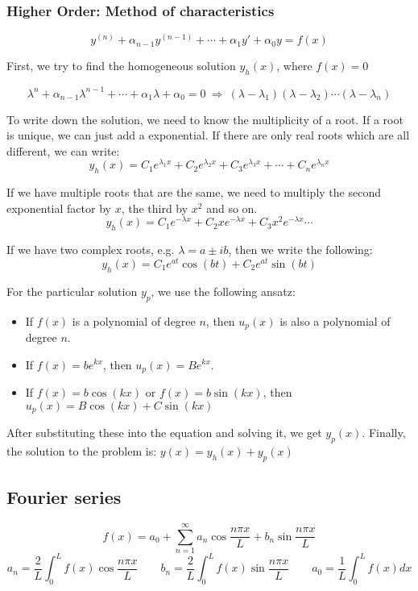\documentclass[a4paper]{article}
\begin{document}
\begin{twocolumn}
\subsubsection{Higher Order: Method of characteristics}

$$y^{(n)} + \alpha_{n-1} y^{(n-1)} + \cdots +  \alpha_1 y' + \alpha_0 y = f(x)$$

First, we try to find the homogeneous solution $y_h(x)$, where $f(x) = 0$

$$\lambda^n + \alpha_{n-1} \lambda^{n-1} + \cdots + \alpha_1 \lambda + \alpha_0 = 0 \ \Rightarrow \ (\lambda - \lambda_1) (\lambda - \lambda_2) \cdots (\lambda - \lambda_n)$$

To write down the solution, we need to know the multiplicity of a root. If a root is unique, we can just add a exponential. If there are only real roots which are all different, we can write:
$$y_h(x) = C_1 e^{\lambda_1 x} + C_2 e^{\lambda_2 x} + C_3 e^{\lambda_3 x} + \cdots + C_n e^{\lambda_n x}$$

If we have multiple roots that are the same, we need to multiply the second exponential factor by $x$, the third by $x^2$ and so on. 
$$y_h(x) = C_1 e^{-\lambda x} + C_2 x e^{-\lambda x} + C_3 x^2 e^{-\lambda x} \cdots$$

If we have two complex roots, e.g. $\lambda = a \pm ib$, then we write the following:
$$y_h(x) = C_1 e^{a t} \cos(bt) + C_2 e^{a t} \sin(bt)$$ 

For the particular solution $y_p$, we use the following ansatz:
\begin{itemize}
	\item If $f(x)$ is a polynomial of degree $n$, then $u_p(x)$ is also a polynomial of degree $n$. 
	\item If $f(x) = b e^{k x}$, then $u_p(x) = B e^{k x}$. 
	\item If $f(x) = b \cos(k x)$ or $f(x) = b \sin(k x)$, then $u_p(x) = B \cos(k x) + C \sin (k x)$ 
\end{itemize}
After substituting these into the equation and solving it, we get $y_p(x)$. Finally, the solution to the problem is: $y(x) = y_h(x) + y_p(x)$


\subsection{Fourier series}

$$f(x) = a_0 + \sum_{n=1}^{\infty} a_n \cos \frac{n\pi x}{L} + b_n \sin \frac{n\pi x}{L} $$
$$a_n = \frac{2}{L} \int_{0}^{L} f(x) \cos \frac{n \pi x}{L} \qquad b_n = \frac{2}{L} \int_0^L f(x) \sin \frac{n \pi x}{L} \qquad a_0 = \frac{1}{L} \int_{0}^{L} f(x) dx$$


\end{twocolumn}
\end{document}
